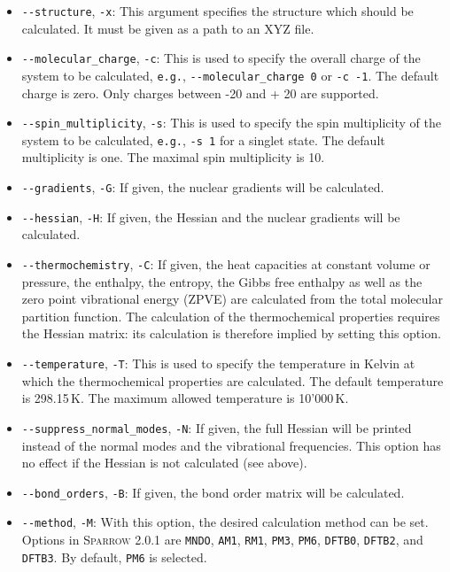 \documentclass[]{tufte-book}
\begin{document}
\begin{itemize}
\item \texttt{-{}-structure}, \texttt{-x}: This argument specifies the structure which should be calculated. It must be given
as a path to an XYZ file.
\item \texttt{-{}-molecular\_charge}, \texttt{-c}: This is used to specify the overall charge of the system to be calculated, 
\texttt{e.g.}, \texttt{-{}-molecular\_charge 0} or \texttt{-c -1}. The default charge is zero.
Only charges between -20 and + 20 are supported.
\item \texttt{-{}-spin\_multiplicity}, \texttt{-s}: This is used to specify the spin multiplicity of the system to be
calculated, \texttt{e.g.}, \texttt{-s 1} for a singlet state. The default multiplicity is one. The maximal spin multiplicity is 10.
\item \texttt{-{}-gradients}, \texttt{-G}: If given, the nuclear gradients will be calculated.
\item \texttt{-{}-hessian}, \texttt{-H}: If given, the Hessian and the nuclear gradients will be calculated.
\item \texttt{-{}-thermochemistry}, \texttt{-C}: If given, the heat capacities at constant volume or pressure, 
the enthalpy, the entropy, the Gibbs free enthalpy as well as the zero point vibrational energy (ZPVE) are calculated
from the total molecular partition function.
The calculation of the thermochemical properties requires the Hessian matrix: its calculation is therefore implied by setting this option.
\item \texttt{-{}-temperature}, \texttt{-T}: This is used to specify the temperature in Kelvin at which the thermochemical properties are calculated.
The default temperature is 298.15\,K. The maximum allowed temperature is 10'000\,K.
\item \texttt{-{}-suppress\_normal\_modes}, \texttt{-N}: If given, the full Hessian will be printed instead of the normal 
modes and the vibrational frequencies. This option has no effect if the Hessian is not calculated (see above).
\item \texttt{-{}-bond\_orders}, \texttt{-B}: If given, the bond order matrix will be calculated.
\item \texttt{-{}-method}, \texttt{-M}: With this option, the desired calculation method can be set. Options in
\textsc{Sparrow} 2.0.1 are \texttt{MNDO}, \texttt{AM1}, \texttt{RM1}, \texttt{PM3}, \texttt{PM6}, \texttt{DFTB0}, \texttt{DFTB2}, and
\texttt{DFTB3}. By default, \texttt{PM6} is selected.

\end{itemize}
\end{document}

